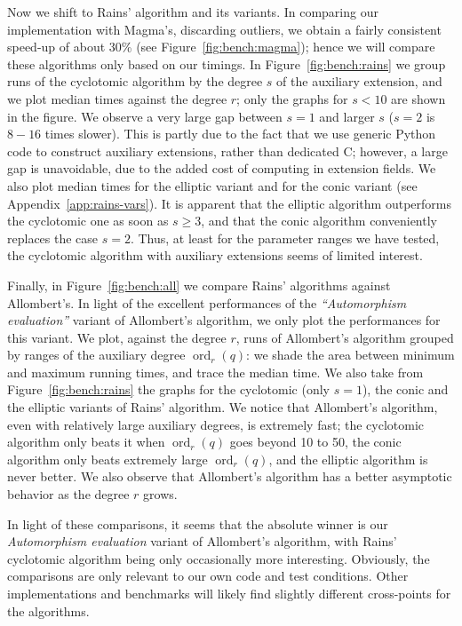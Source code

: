 \documentclass{mcom-l}
\theoremstyle{plain}
\theoremstyle{definition}
\DeclareMathOperator{\order}{ord} %
\newcounter{algorithm}
\begin{document}
Now we shift to Rains' algorithm and its variants. %
In comparing our implementation with Magma's, discarding outliers, we
obtain a fairly consistent speed-up of about 30\% (see
Figure~\ref{fig:bench:magma}); hence we will compare these algorithms
only based on our timings. %
In Figure~\ref{fig:bench:rains} we group runs of the cyclotomic
algorithm by the degree $s$ of the auxiliary extension, and we plot
median times against the degree $r$; only the graphs for $s<10$ are
shown in the figure. %
We observe a very large gap between $s=1$ and larger $s$
($s=2$ is $8-16$ times slower). This is partly due to the fact that we
use generic Python code to construct auxiliary extensions, rather than
dedicated C; however, a large gap is unavoidable, due to the added cost
of computing in extension fields. %
We also plot median times for the elliptic variant and for the conic
variant (see Appendix~\ref{app:rains-vars}). %
It is apparent that the elliptic algorithm outperforms the cyclotomic
one as soon as $s\ge 3$, and that the conic algorithm conveniently
replaces the case $s=2$. %
Thus, at least for the parameter ranges we have tested, the cyclotomic
algorithm with auxiliary extensions seems of limited interest.

Finally, in Figure~\ref{fig:bench:all} we compare Rains' algorithms
against Allombert's. %
In light of the excellent performances of the \emph{``Automorphism
  evaluation''} variant of Allombert's algorithm, we only plot the
performances for this variant. %
We plot, against the degree $r$, runs of Allombert's algorithm grouped
by ranges of the auxiliary degree $\order_r(q)$: we shade the area
between minimum and maximum running times, and trace the median
time. %
We also take from Figure~\ref{fig:bench:rains} the graphs for the
cyclotomic (only $s=1$), the conic and the elliptic variants of Rains'
algorithm. %
We notice that Allombert's algorithm, even with relatively large
auxiliary degrees, is extremely fast; the cyclotomic algorithm only
beats it when $\order_r(q)$ goes beyond 10 to 50, the conic algorithm
only beats extremely large $\order_r(q)$, and the elliptic algorithm
is never better. %
We also observe that Allombert's algorithm has a better asymptotic
behavior as the degree $r$ grows.

In light of these comparisons, it seems that the absolute winner is
our \emph{Automorphism evaluation} variant of Allombert's algorithm,
with Rains' cyclotomic algorithm being only occasionally more
interesting. %
Obviously, the comparisons are only relevant to our own code and test
conditions. Other implementations and benchmarks will likely find
slightly different cross-points for the algorithms.
\end{document}

